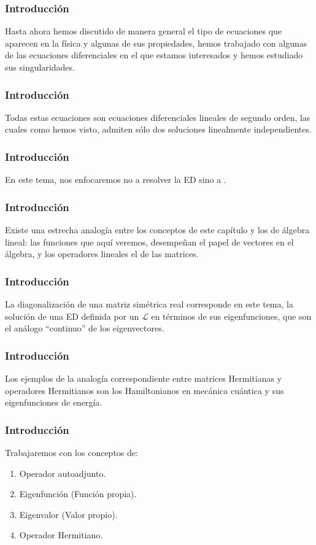 \documentclass[12pt]{beamer}
\begin{document}
\begin{frame}
\frametitle{Introducción}
Hasta ahora hemos discutido de manera general el tipo de ecuaciones que aparecen en la física y algunas de sus propiedades, hemos trabajado con algunas de las ecuaciones diferenciales en el que estamos interesados y hemos estudiado sus singularidades.
\end{frame}
\begin{frame}
\frametitle{Introducción}
Todas estas ecuaciones son ecuaciones diferenciales lineales de segundo orden, las cuales como hemos visto, admiten sólo dos soluciones linealmente independientes.
\end{frame}
\begin{frame}
\frametitle{Introducción}
En este tema, nos enfocaremos no a resolver la ED sino a .
\end{frame}
\begin{frame}
\frametitle{Introducción}
Existe una estrecha analogía entre los conceptos de este capítulo y los de álgebra lineal: \pause las funciones que aquí veremos, desempeñan el papel de vectores en el álgebra, y los operadores lineales el de las matrices.
\end{frame}
\begin{frame}
\frametitle{Introducción}
La diagonalización de una matriz simétrica real corresponde en este tema, la solución de una ED definida por un  $\mathcal{L}$ en términos de sus eigenfunciones, que son el análogo \enquote{continuo} de los eigenvectores.
\end{frame}
\begin{frame}
\frametitle{Introducción}
Los ejemplos de la analogía correspondiente entre matrices Hermitianas y operadores Hermitianos son los Hamiltonianos en mecánica cuántica y sus eigenfunciones de energía.
\end{frame}
\begin{frame}
\frametitle{Introducción}
Trabajaremos con los conceptos de:
\begin{enumerate}[<+->]
\item Operador autoadjunto.
\item Eigenfunción (Función propia).
\item Eigenvalor (Valor propio).
\item Operador Hermitiano.
\end{enumerate}
\end{frame}
\end{document}
